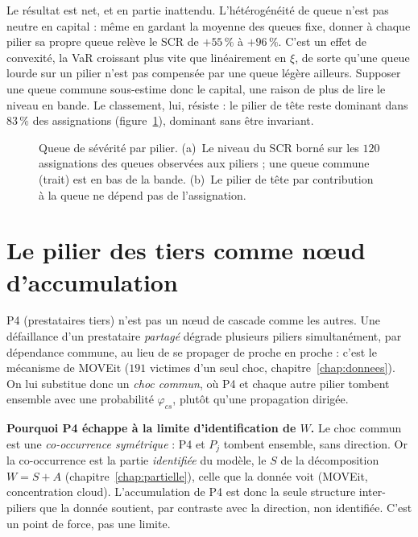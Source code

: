 Le résultat est net, et en partie inattendu. L'hétérogénéité de queue n'est pas
neutre en capital : même en gardant la moyenne des queues fixe, donner à chaque pilier sa
propre queue relève le SCR de $+55\,\%$ à $+96\,\%$. C'est un effet de convexité, la
VaR croissant plus vite que linéairement en $\xi$, de sorte qu'une queue lourde sur un pilier
n'est pas compensée par une queue légère ailleurs. Supposer une queue commune
sous-estime donc le capital, une raison de plus de lire le niveau en bande. Le classement,
lui, résiste : le pilier de tête reste dominant dans $83\,\%$ des assignations
(figure~\ref{fig:xi-pilier}), dominant sans être invariant.

\begin{figure}[htbp]\centering
{}
\caption{Queue de sévérité par pilier. (a)~Le niveau du SCR borné sur les $120$ assignations
des queues observées aux piliers ; une queue commune (trait) est en bas de la bande.
(b)~Le pilier de tête par contribution à la queue ne dépend pas de l'assignation.}
\label{fig:xi-pilier}
\end{figure}

\section{Le pilier des tiers comme n\oe{}ud d'accumulation}
\label{sec:p4-accumulation}

P4 (prestataires tiers) n'est pas un n\oe{}ud de cascade comme les autres. Une défaillance
d'un prestataire \emph{partagé} dégrade plusieurs piliers simultanément, par
dépendance commune, au lieu de se propager de proche en proche : c'est le mécanisme de MOVEit
($191$ victimes d'un seul choc, chapitre~\ref{chap:donnees}). On lui
substitue donc un
\emph{choc commun}, où P4 et chaque autre pilier tombent ensemble avec une probabilité
$\varphi_{cs}$, plutôt qu'une propagation dirigée.

\begin{cle}
\textbf{Pourquoi P4 échappe à la limite d'identification de $W$.} Le choc commun est une
\emph{co-occurrence symétrique} : P4 et $P_j$ tombent ensemble, sans direction. Or la
co-occurrence est la partie \emph{identifiée} du modèle, le $S$ de la décomposition
$W=S+A$ (chapitre~\ref{chap:partielle}), celle que la donnée voit (MOVEit, concentration
cloud). L'accumulation de P4 est donc la seule structure inter-piliers que la donnée
soutient, par contraste avec la direction, non identifiée. C'est un point de force, pas une
limite.
\end{cle}

